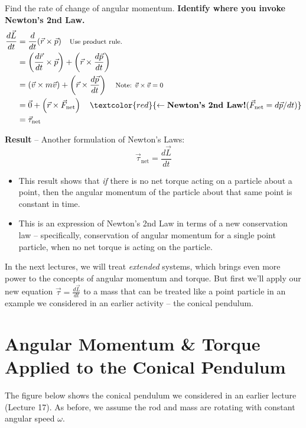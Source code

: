 \documentclass[11pt, letterpaper, openany]{book}
\newenvironment{exercise}[1][Exercise]{%
  \tcolorbox[blanker, breakable, left=1em,
    before skip=1em, after skip=1em,
    borderline west={3pt}{0pt}{PhysNavy},
    colback=PhysCream,
    before upper={\textcolor{PhysNavy}{\sffamily\bfseries #1:}\space}
  ]%
}{%
  \endtcolorbox%
}
\begin{document}
\begin{exercise}[Exercise 7]
Find the rate of change of angular momentum. \textbf{Identify where you invoke Newton's 2nd Law.} \\
\textcolor{blue}{
\begin{align*}
    \frac{d\vec{L}}{dt} &= \frac{d}{dt}(\vec{r} \times \vec{p}) \quad \text{\footnotesize{Use product rule.}} \\
    &= \left( \frac{d\vec{r}}{dt} \times \vec{p} \right) + \left( \vec{r} \times \frac{d\vec{p}}{dt} \right) \\
    &= \left( \vec{v} \times m\vec{v} \right) + \left( \vec{r} \times \frac{d\vec{p}}{dt} \right) \quad \text{\footnotesize{Note: $\vec{v} \times \vec{v} = 0$}} \\
    &= \vec{0} + \left( \vec{r} \times \vec{F}_{\text{net}} \right) \quad \textcolor{red}{\leftarrow \textbf{Newton's 2nd Law!} (\vec{F}_{\text{net}} = d\vec{p}/dt)} \\
    &= \vec{\tau}_{\text{net}}
\end{align*}
}
\end{exercise}

\textbf{Result} -- Another formulation of Newton's Laws:
\[ \vec{\tau}_{\text{net}} = \frac{d\vec{L}}{dt} \]
\begin{itemize}
    \item This result shows that \textit{if} there is no net torque acting on a particle about a point, then the angular momentum of the particle about that same point is constant in time.
    \item This is an expression of Newton's 2nd Law in terms of a new conservation law -- specifically, conservation of angular momentum for a single point particle, when no net torque is acting on the particle.
\end{itemize}

In the next lectures, we will treat \textit{extended} systems, which brings even more power to the concepts of angular momentum and torque. But first we'll apply our new equation $\vec{\tau} = \frac{d\vec{L}}{dt}$ to a mass that can be treated like a point particle in an example we considered in an earlier activity -- the conical pendulum.

\section*{Angular Momentum \& Torque Applied to the Conical Pendulum}

The figure below shows the conical pendulum we considered in an earlier lecture (Lecture 17). As before, we assume the rod and mass are rotating with constant angular speed $\omega$.
\end{document}
